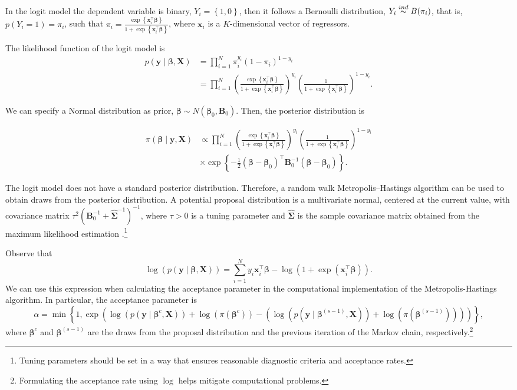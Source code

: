 In the logit model the dependent variable is binary, $Y_i=\left\{1,0\right\}$, then it follows a Bernoulli distribution, $Y_i\stackrel{ind} {\thicksim}B(\pi_i)$, that is, $p(Y_i=1)=\pi_i$, such that $\pi_i=\frac{\exp\left\{{\bm{x}}_i^{\top}\bm{\beta}\right\}}{1+\exp\left\{{\bm{x}}_i^{\top}\bm{\beta}\right\}}$, where $\bm x_i$ is a $K$-dimensional vector of regressors.

The likelihood function of the logit model is
\begin{align*}
	p({\bm{y}}\mid \bm{\beta},{\bm{X}})&=\prod_{i=1}^N \pi_i^{y_i}(1-\pi_i)^{1-y_i}\\
	&=\prod_{i=1}^N\left(\frac{\exp\left\{{\bm{x}}_i^{\top}\bm{\beta}\right\}}{1+\exp\left\{{\bm{x}}_i^{\top}\bm{\beta}\right\}}\right)^{y_i}\left(\frac{1}{1+\exp\left\{{\bm{x}}_i^{\top}\bm{\beta}\right\}}\right)^{1-y_i}.
\end{align*}

We can specify a Normal distribution as prior, $\bm{\beta}\sim N({\bm{\beta}}_0,{\bm{B}}_0)$. Then, the posterior distribution is

\begin{align*}
	\pi(\bm{\beta}\mid {\bm{y}},{\bm{X}})&\propto\prod_{i=1}^N\left(\frac{\exp\left\{{\bm{x}}_i^{\top}\bm{\beta}\right\}}{1+\exp\left\{{\bm{x}}_i^{\top}\bm{\beta}\right\}}\right)^{y_i}\left(\frac{1}{1+\exp\left\{{\bm{x}}_i^{\top}\bm{\beta}\right\}}\right)^{1-y_i}\\
	&\times\exp\left\{-\frac{1}{2}(\bm{\beta}-\bm{\beta}_0)^{\top}\bm{B}_0^{-1}(\bm{\beta}-\bm{\beta}_0)\right\}.
\end{align*}

The logit model does not have a standard posterior distribution. Therefore, a random walk Metropolis--Hastings algorithm can be used to obtain draws from the posterior distribution. A potential proposal distribution is a multivariate normal, centered at the current value, with covariance matrix $\tau^2({\bm{B}}_0^{-1} + \widehat{{\bm{\Sigma}}}^{-1})^{-1}$, where $\tau > 0$ is a tuning parameter and $\widehat{\bm{\Sigma}}$ is the sample covariance matrix obtained from the maximum likelihood estimation \cite{Martin2011}.\footnote{Tuning parameters should be set in a way that ensures reasonable diagnostic criteria and acceptance rates.}

Observe that 
\[
\log(p({\bm{y}} \mid \bm{\beta}, {\bm{X}})) = \sum_{i=1}^N y_i {\bm{x}}_i^{\top} \bm{\beta} - \log(1 + \exp({\bm{x}}_i^{\top} \bm{\beta})).
\]
We can use this expression when calculating the acceptance parameter in the computational implementation of the Metropolis-Hastings algorithm. In particular, the acceptance parameter is
\[
\alpha = \min\left\{1, \exp\left(\log(p({\bm{y}} \mid \bm{\beta}^{c}, {\bm{X}})) + \log(\pi(\bm{\beta}^c)) - \left(\log(p({\bm{y}} \mid \bm{\beta}^{(s-1)}, {\bm{X}})) + \log(\pi(\bm{\beta}^{(s-1)}))\right)\right)\right\},
\]
where $\bm{\beta}^c$ and $\bm{\beta}^{(s-1)}$ are the draws from the proposal distribution and the previous iteration of the Markov chain, respectively.\footnote{Formulating the acceptance rate using $\log$ helps mitigate computational problems.}

